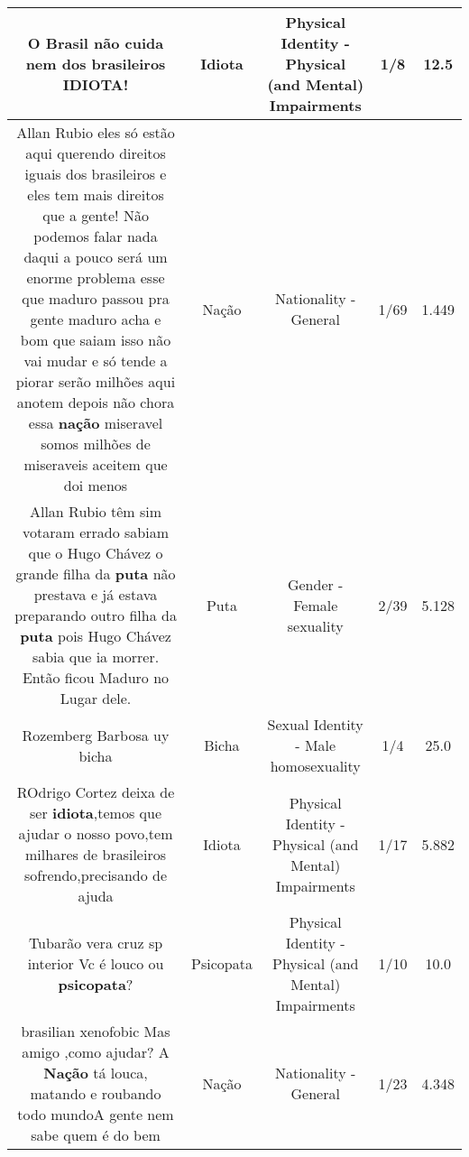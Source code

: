 \documentclass[11pt]{article}
\newlength\mylength
\begin{document}
\begin{center}
\begin{longtable}{|C{.65\mylength}|C{.30\mylength}|C{.12\mylength}|C{.12\mylength}|C{.12\mylength}|}
  \small O Brasil não cuida nem dos brasileiros \textbf{IDIOTA}!\normalsize   & Idiota & Physical Identity - Physical (and Mental) Impairments & 1/8 & 12.5 \\  \hline
  \small Allan Rubio eles só estão aqui querendo direitos iguais dos brasileiros e eles tem mais direitos que a gente! Não podemos falar nada daqui a pouco será um enorme problema esse que maduro passou pra gente maduro acha e bom que saiam isso não vai mudar e só tende a piorar serão milhões aqui anotem depois não chora essa \textbf{nação} miseravel somos milhões de miseraveis aceitem que doi menos\normalsize   & Nação & Nationality - General & 1/69 & 1.449 \\  \hline
  \small Allan Rubio têm sim votaram errado sabiam que o Hugo Chávez  o grande filha da \textbf{puta} não prestava  e já estava preparando  outro filha da \textbf{puta}  pois Hugo Chávez sabia que ia morrer. Então ficou Maduro no Lugar dele.\normalsize   & Puta & Gender - Female sexuality & 2/39 & 5.128 \\  \hline
  \small Rozemberg Barbosa uy bicha\normalsize   & Bicha & Sexual Identity - Male homosexuality & 1/4 & 25.0 \\  \hline
  \small ROdrigo Cortez deixa de ser \textbf{idiota},temos que ajudar o nosso povo,tem milhares de brasileiros sofrendo,precisando de ajuda\normalsize   & Idiota & Physical Identity - Physical (and Mental) Impairments & 1/17 & 5.882 \\  \hline
  \small Tubarão vera cruz sp interior Vc é louco ou \textbf{psicopata}?\normalsize   & Psicopata & Physical Identity - Physical (and Mental) Impairments & 1/10 & 10.0 \\  \hline
  \small brasilian xenofobic Mas amigo ,como ajudar?  A \textbf{Nação} tá louca, matando e roubando todo mundoA gente nem sabe quem é do bem\normalsize   & Nação & Nationality - General & 1/23 & 4.348 \\  \hline

\end{longtable}
\end{center}
\end{document}
